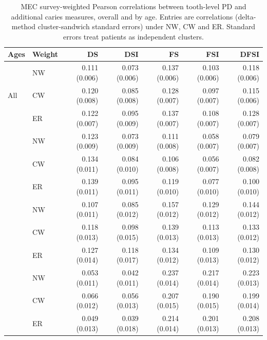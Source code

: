 \begin{table}[!t]
\caption{MEC survey-weighted Pearson correlations between tooth-level PD and additional caries measures, overall and by age. Entries are correlations (delta-method cluster-sandwich standard errors) under NW, CW and ER. Standard errors treat patients as independent clusters.}
\label{tab:supp_nhanes_pd}
\centering\scriptsize\setlength{\tabcolsep}{2pt}
\begin{tabular}{llrrrrr}
\toprule
Ages & Weight & DS & DSI & FS & FSI & DFSI \\
\midrule
\multirow[t]{3}{*}{All} & NW & 0.111 (0.006) & 0.073 (0.006) & 0.137 (0.006) & 0.103 (0.006) & 0.118 (0.006) \\
 & CW & 0.120 (0.008) & 0.085 (0.008) & 0.128 (0.007) & 0.097 (0.007) & 0.115 (0.006) \\
 & ER & 0.122 (0.007) & 0.095 (0.009) & 0.137 (0.007) & 0.108 (0.007) & 0.128 (0.007) \\
\addlinespace[4pt]
\multirow[t]{3}{*}{30--49} & NW & 0.123 (0.009) & 0.073 (0.009) & 0.111 (0.008) & 0.058 (0.007) & 0.079 (0.007) \\
 & CW & 0.134 (0.011) & 0.084 (0.010) & 0.106 (0.008) & 0.056 (0.007) & 0.082 (0.008) \\
 & ER & 0.139 (0.011) & 0.095 (0.011) & 0.119 (0.010) & 0.077 (0.010) & 0.100 (0.010) \\
\addlinespace[4pt]
\multirow[t]{3}{*}{50--64} & NW & 0.107 (0.011) & 0.085 (0.012) & 0.157 (0.012) & 0.129 (0.012) & 0.144 (0.012) \\
 & CW & 0.118 (0.013) & 0.098 (0.015) & 0.139 (0.013) & 0.113 (0.013) & 0.133 (0.012) \\
 & ER & 0.127 (0.014) & 0.118 (0.017) & 0.134 (0.012) & 0.109 (0.013) & 0.130 (0.012) \\
\addlinespace[4pt]
\multirow[t]{3}{*}{$65+$} & NW & 0.053 (0.011) & 0.042 (0.011) & 0.237 (0.014) & 0.217 (0.014) & 0.223 (0.013) \\
 & CW & 0.066 (0.012) & 0.056 (0.013) & 0.207 (0.015) & 0.190 (0.015) & 0.199 (0.014) \\
 & ER & 0.049 (0.013) & 0.039 (0.018) & 0.214 (0.014) & 0.201 (0.013) & 0.208 (0.013) \\
\bottomrule
\end{tabular}
\end{table}
